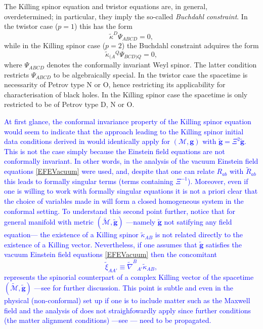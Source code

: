 \documentclass[10pt,a4paper]{article}
\theoremstyle{plain}
\def\bmg{{\bm g}}
\newcounter{mnotecount}%
\newcommand{\mnotex}[1]%
{\protect{\stepcounter{mnotecount}}$^{\mbox{\footnotesize $\bullet$\themnotecount}}$ 
\marginpar{%
\raggedright\tiny\em
$\!\!\!\!\!\!\,\bullet$\themnotecount: #1} }
\begin{document}
The Killing spinor equation and twistor equations are, in general,
overdetermined; in particular, they imply the so-called
\textit{Buchdahl constraint}.  In the twistor case ($p=1$) this has
the form
\[
\tilde{\kappa}^D\Psi_{ABCD}=0,
\]
while in the Killing spinor case ($p=2$) the Buchdahl constraint
adquires the form
\[
\tilde{\kappa}_{(A}{}^Q\Psi_{BCD)Q}=0,
\]
where $\Psi_{ABCD}$ denotes the conformally invariant Weyl spinor.
The latter condition restricts $\Psi_{ABCD}$ to be algebraically
special.  In the twistor case the spacetime is necessarity of Petrov
type N or O, hence restricting its applicability for characterisation of
black holes.  In the Killing spinor case the spacetime is only
restricted to be of Petrov type D, N or O.

\medskip

\textcolor{blue}{
At first glance, the conformal invariance property of the
Killing spinor equation would seem to indicate that the
approach leading to the Killing spinor initial data conditions derived
in \cite{GarVal08c} would identically apply for $(\mathcal{M},\bmg)$
with $\tilde\bmg=\Xi^2\tilde{\bmg}$. This is not the case simply
because the Einstein field equations are not conformally invariant.
In other words, in the analysis of \cite{GarVal08c} the vacuum
Einstein field equations \eqref{EFEVacuum}
were used, and, despite
that one can relate $R_{ab}$ with $\tilde{R}_{ab}$ this leads to
formally singular terms (terms containing $\Xi^{-1}$). Moreover, even if one
is willing to work with formally singular equations it is not a priori clear
that the choice of variables made in \cite{GarVal08c} will form a
closed homogeneous system in the conformal setting.  To understand
this second point further, notice that for general manifold with
metric $(\tilde{\mathcal{M}},\tilde{\bmg})$ ---namely $\tilde{\bmg}$
not satifying any field equation--- the existence of a Killing spinor
$\tilde{\kappa}_{AB}$ is not related directly to the existence of a
Killing vector.
Nevertheless, if one assumes that $\tilde{\bmg}$
satisfies the vacuum Einstein field equations \eqref{EFEVacuum} then
the concomitant
\begin{equation*}
\tilde{\xi}_{AA'} \equiv \tilde{\nabla}^{B}{}_{A'}\tilde{\kappa}_{AB},
\end{equation*}
represents the spinorial counterpart of a complex Killing vector of
the spacetime $(\tilde{\mathcal{M}},\tilde{\bmg})$ ---see
\cite{GarVal08c} for further discussion. This point is subtle and even
in the physical (non-conformal) set up if one is to include matter
such as the Maxwell field and the analysis of \cite{GarVal08c} does
not straighfowardly apply since further conditions (the matter
alignment conditions) ---see \cite{ValCol16}--- need to be propagated.
}
\end{document}

